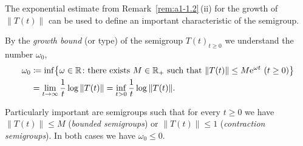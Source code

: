 The exponential estimate from Remark~\ref{rem:a1-1.2}\,(ii) for the growth of\/ $ \lVert T(t) \rVert $ can be used to define an important characteristic of the semigroup.
\begin{definition}\label{def:a1-1.3}
By the \emph{growth bound} (or type) of the semigroup $ T(t)_{t\geq0} $ we understand the number $ \omega_{0} $,
\begin{equation}\label{eq:a1-1.1}
\begin{aligned}
    \omega_{0} & \coloneq \inf \bigl\{ \omega \in \R \colon \text{there exists } %
         M \in \R_{+} \text{ such that }
        \|T(t)\| \leq M \eu^{\omega t} \ (t \geq 0) \bigr\} \\
    & = \lim_{t\to\infty} \frac{1}{t}\log\|T(t)\|
      = \inf_{t>0} \frac{1}{t}\log\|T(t)\| .
\end{aligned}
\end{equation}
\end{definition}
Particularly important are semigroups such that for every $t \geq 0$ we have $\|T(t)\| \leq M$ (\emph{bounded semigroups}) or $\|T(t)\| \leq 1$ (\emph{contraction semigroups}).
In both cases we have $\omega_{0} \leq 0$.

